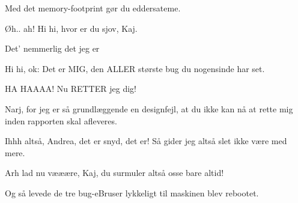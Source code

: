 \documentclass[a4paper,11pt]{article}
\begin{document}
\begin{sketch}
   Med det memory-footprint gør du eddersateme.

   Øh.. ah! Hi hi, hvor er du sjov, Kaj.

   Det' nemmerlig det jeg er

   Hi hi, ok:  Det er MIG, den ALLER største bug du
  nogensinde har set.

   HA HAAAA! Nu RETTER jeg dig!

   Narj, for jeg er så grundlæggende en designfejl, at du ikke kan nå at
  rette mig inden rapporten skal afleveres.

   Ihhh altså, Andrea, det er snyd, det er!  Så gider jeg altså slet ikke
  være med mere.

   Arh lad nu vææære, Kaj, du surmuler altså osse bare altid!

   Og så levede de tre bug-eBruser lykkeligt til maskinen blev rebootet.


\end{sketch}
\end{document}
